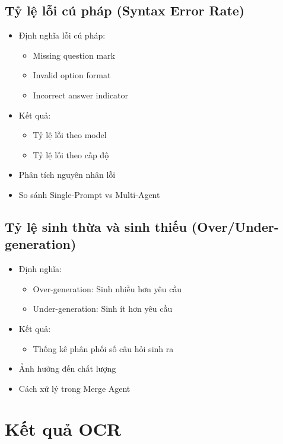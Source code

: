 \subsection{Tỷ lệ lỗi cú pháp (Syntax Error Rate)}
\begin{itemize}
    \item Định nghĩa lỗi cú pháp:
    \begin{itemize}
        \item Missing question mark
        \item Invalid option format
        \item Incorrect answer indicator
    \end{itemize}
    \item Kết quả:
    \begin{itemize}
        \item Tỷ lệ lỗi theo model
        \item Tỷ lệ lỗi theo cấp độ
    \end{itemize}
    \item Phân tích nguyên nhân lỗi
    \item So sánh Single-Prompt vs Multi-Agent
\end{itemize}

\subsection{Tỷ lệ sinh thừa và sinh thiếu (Over/Under-generation)}
\begin{itemize}
    \item Định nghĩa:
    \begin{itemize}
        \item Over-generation: Sinh nhiều hơn yêu cầu
        \item Under-generation: Sinh ít hơn yêu cầu
    \end{itemize}
    \item Kết quả:
    \begin{itemize}
        \item Thống kê phân phối số câu hỏi sinh ra
    \end{itemize}
    \item Ảnh hưởng đến chất lượng
    \item Cách xử lý trong Merge Agent
\end{itemize}

\section{Kết quả OCR}

